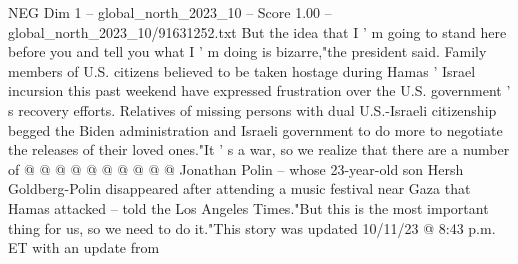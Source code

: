 \begin{textsample}{NEG Dim 1 – global\_north\_2023\_10 – Score 1.00 – global\_north\_2023\_10/91631252.txt}
But the idea that I ' m going to stand here before you and tell you what I ' m doing is bizarre,"the president said.
Family members of U.S. citizens believed to be taken hostage during Hamas ' Israel incursion this past weekend have expressed frustration over the U.S. government ' s recovery efforts.
Relatives of missing persons with dual U.S.-Israeli citizenship begged the Biden administration and Israeli government to do more to negotiate the releases of their loved ones."It ' s a war, so we realize that there are a number of @ @ @ @ @ @ @ @ @ @ Jonathan Polin -- whose 23-year-old son Hersh Goldberg-Polin disappeared after attending a music festival near Gaza that Hamas attacked -- told the Los Angeles Times."But this is the most important thing for us, so we need to do it."This story was updated 10/11/23 @ 8:43 p.m.
ET with an update from

\end{textsample}
